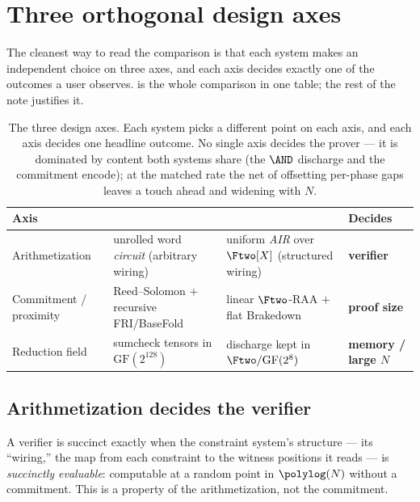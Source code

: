 \section{Three orthogonal design axes}
\label{sec:axes}

The cleanest way to read the comparison is that each system makes an
independent choice on three axes, and each axis decides exactly one of
the outcomes a user observes.  is the whole comparison in
one table; the rest of the note justifies it.

\begin{table}[t]
\centering
\renewcommand{\arraystretch}{1.25}
\begin{tabularx}{\textwidth}{@{}lXXl@{}}
\toprule
\textbf{Axis} & \textbf{\binius{}} & \textbf{\zinc{}} & \textbf{Decides} \\
\midrule
Arithmetization &
  unrolled word \emph{circuit} (arbitrary wiring) &
  uniform \emph{AIR} over $\Ftwo[X]$ (structured wiring) &
  \textbf{verifier} \\
Commitment / proximity &
  Reed--Solomon $+$ recursive FRI/BaseFold &
  linear $\Ftwo$-RAA $+$ flat Brakedown &
  \textbf{proof size} \\
Reduction field &
  sumcheck tensors in $\mathrm{GF}(2^{128})$ &
  discharge kept in $\Ftwo/\mathrm{GF}(2^8)$ &
  \textbf{memory / large $N$} \\
\bottomrule
\end{tabularx}
\caption{The three design axes. Each system picks a different point on
each axis, and each axis decides one headline outcome. No single axis
decides the prover --- it is dominated by content both systems share (the
$\AND$ discharge and the commitment encode); at the matched rate the net
of offsetting per-phase gaps leaves \zinc{} a touch ahead and widening
with $N$.}
\label{tab:axes}
\end{table}

\subsection{Arithmetization decides the verifier}
\label{sec:axis-arith}

A verifier is succinct exactly when the constraint system's structure ---
its ``wiring,'' the map from each constraint to the witness positions it
reads --- is \emph{succinctly evaluable}: computable at a random point in
$\polylog(N)$ without a commitment. This is a property of the
arithmetization, not the commitment.

